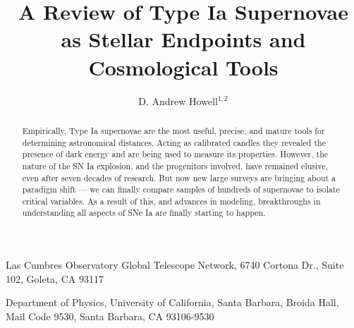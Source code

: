 \documentclass{nature1}
\title{A Review of Type Ia Supernovae as Stellar Endpoints and Cosmological Tools}
\author{D. Andrew Howell$^{1,2}$}
\begin{document}
\maketitle

\begin{affiliations}
\item Las Cumbres Observatory Global Telescope Network,
 6740 Cortona Dr., Suite 102, Goleta, CA 93117
\item Department of Physics, University of California,
 Santa Barbara, Broida Hall, Mail Code 9530, Santa Barbara, CA 93106-9530
\end{affiliations}

\newcommand\ion[2]{#1$\;${\small\rmfamily\@Roman{#2}}\relax}%
\newcommand\nodata{ ~$\cdots$~ }%
\newcommand\arcdeg{\mbox{$^\circ$}}%
\newcommand\degr{\arcdeg}%
\newcommand{\etal}{et~al.\,}
\newcommand{\Msun}{${\rm M}_\odot$}          
\newcommand{\drp}{$\Delta m_{15}(B)$} 
\newcommand{\Ni}{$^{56}\rm Ni$} 
\newcommand{\Co}{$^{56}\rm Co$} 
\newcommand{\Fe}{$^{56}\rm Fe$} 
\newcommand{\kps}{km s$^{-1}$}
\newcommand{\kms}{km s$^{-1}$}
\newcommand{\MCh}{$M_{\rm Ch}$}
\newcommand{\hof}{H\"oflich}
\newcommand{\eg}{e.\,g.\,}
\newcommand{\ie}{i.\,e.\,}
\newcommand{\OI}{\ion{O}{1}}
\newcommand{\SiII}{\ion{Si}{2}}
\newcommand{\Si}{\ion{Si}{2}}
\newcommand{\Simain}{\ion{Si}{2} 6150\AA}
\newcommand{\Sifour}{\ion{Si}{2} 4000\AA}
\newcommand{\SII}{\ion{S}{2}}
\newcommand{\CaII}{\ion{Ca}{2}}
\newcommand{\Camain}{\ion{Ca}{2} 3800\AA}
\newcommand{\Ca}{\ion{Ca}{2}}
\newcommand{\TiII}{\ion{Ti}{2}}
\newcommand{\MgII}{\ion{Mg}{2}}
\newcommand{\iab}{i\arcmin (AB)}
\newcommand{\gt}{$>$}
\newcommand{\us}{$u$*}
\newcommand{\gp}{$g$\arcmin}
\newcommand{\rp}{$r$\arcmin}
\newcommand{\ip}{$i$\arcmin}
\newcommand{\zp}{$z$\arcmin}
\newcommand\arcmin{\mbox{$^\prime$}}%
\newcommand\arcsec{\mbox{$^{\prime\prime}$}}%
\newcommand\araa{Ann. Rev. Astron. Astrophys.}%
\newcommand\apj{Astrophys. J.}%
\newcommand\aj{Astron. J.}%
\newcommand\apjl{Astrophys. J. Lett.}%
\newcommand\nar{New Astron. Rev.}%
\newcommand\apjs{Astrophys. J. Suppl.}%
\newcommand\apss{Astrophys. Sp. Sci..}%
\newcommand\aap{Astron. \& Astrophys.}%
\newcommand\mnras{MNRAS}%
\newcommand\nat{Nature}%
\newcommand\iaucirc{IAU~Circ.}%
\newcommand\gca{Geochim.~Cosmochim.~Acta}%
\newcommand\aaps{Astron. \& Astrophys. Suppl. Ser.}%
\newcommand\pasp{PASP}
\newcommand\pasj{PASJ}


\begin{abstract}
  Empirically, Type Ia supernovae are the most useful, precise, and
  mature tools for determining astronomical distances.  Acting as
  calibrated candles they revealed the presence of dark energy and are
  being used to measure its properties.  However, the nature of
  the SN Ia explosion, and the progenitors involved, have remained
  elusive, even after seven decades of research.  But now new large
  surveys are bringing about a paradigm shift --- we can finally
  compare samples of hundreds of supernovae to isolate critical
  variables.  As a result of this, and advances in modeling,
  breakthroughs in understanding all aspects of SNe Ia are finally
  starting to happen.
\end{abstract}
\end{document}
